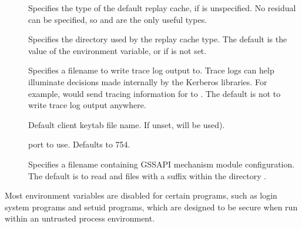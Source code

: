 \documentclass[letterpaper,10pt,english]{sphinxmanual}
\begin{document}
\begin{description}
\item[{}] \leavevmode
Specifies the type of the default replay cache, if
 is unspecified.  No residual can be specified,
so  and  are the only useful types.

\item[{}] \leavevmode
Specifies the directory used by the  replay cache type.
The default is the value of the  environment variable,
or  if  is not set.

\item[{}] \leavevmode
Specifies a filename to write trace log output to.  Trace logs can
help illuminate decisions made internally by the Kerberos
libraries.  For example, 
would send tracing information for {\hyperref[\detokenize{user/user_commands/kinit:kinit-1}]{}} to
.  The default is not to write trace log output
anywhere.

\item[{}] \leavevmode
Default client keytab file name.  If unset,  will be
used).

\item[{}] \leavevmode
{} port to use.  Defaults to 754.

\item[{}] \leavevmode
Specifies a filename containing GSSAPI mechanism module
configuration.  The default is to read 
and files with a  suffix within the directory
.

\end{description}

Most environment variables are disabled for certain programs, such as
login system programs and setuid programs, which are designed to be
secure when run within an untrusted process environment.
\end{document}
